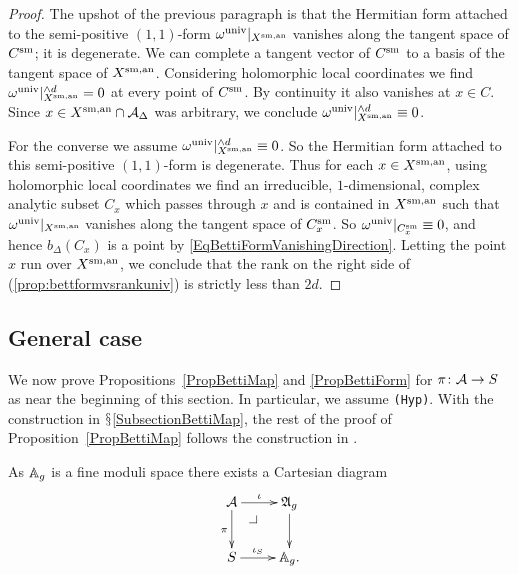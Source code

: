 \begin{proof}
The upshot of the previous paragraph is that the Hermitian form
attached to the semi-positive $(1,1)$-form ${\omega}^{\mathrm{univ}}|_{{X}^{\mathrm{sm,an}}}$
 vanishes along the tangent space of ${C}^{\mathrm{sm}}$; it is degenerate.
We can complete a tangent vector of ${C}^{\mathrm{sm}}$  to a basis of
the tangent space of ${X}^{\mathrm{sm,an}}$. Considering holomorphic local
coordinates
we find ${\omega}^{\mathrm{univ}}|_{{X}^{\mathrm{sm,an}}}^{\wedge d}=0$ at every
point of ${C}^{\mathrm{sm}}$. By continuity it also vanishes at $x \in C$. Since
$x\in {X}^{\mathrm{sm,an}}\cap\mathcal{A}_\Delta$ was arbitrary, we conclude
${\omega}^{\mathrm{univ}}|_{{X}^{\mathrm{sm,an}}}^{\wedge d}\equiv 0$. 

For the converse we assume
${\omega}^{\mathrm{univ}}|_{{X}^{\mathrm{sm,an}}}^{\wedge d}\equiv 0$. So the
Hermitian form attached to this semi-positive $(1,1)$-form is
degenerate. Thus for each $x \in {X}^{\mathrm{sm,an}}$, using holomorphic local coordinates we find an irreducible,  $1$-dimensional,  complex analytic subset $C_x$ which passes through $x$ and is contained in ${X}^{\mathrm{sm,an}}$ such that $\omega^{\mathrm{univ}}|_{{X}^{\mathrm{sm,an}}}$ vanishes along the tangent space of ${C}^{\mathrm{sm}}_x$. So ${\omega}^{\mathrm{univ}}|_{{C}^{\mathrm{sm}}_x}\equiv 0$, and hence 
 $b_\Delta(C_x)$ is a point
by \eqref{EqBettiFormVanishingDirection}.
Letting the point $x$ run over ${X}^{\mathrm{sm,an}}$, we conclude that the rank on the right
side of (\ref{prop:bettformvsrankuniv}) is strictly less than $2d$. 
\end{proof}


\subsection{General case}
We now prove Propositions~\ref{PropBettiMap}
and \ref{PropBettiForm} for
 $\pi \colon \mathcal{A} \rightarrow S$ as near the beginning of this section.
 In particular, we assume \texttt{(Hyp)}. With the construction in $\mathsection$\ref{SubsectionBettiMap}, the rest of the proof of Proposition~\ref{PropBettiMap} follows the construction in \cite[$\mathsection$4]{GaoBettiRank}. 


As
${\mathbb{A}}_g$ is a fine moduli space there exists a Cartesian diagram
\begin{equation*}%
\xymatrix{
\cA \ar[r]^-{\iota} \ar[d]_{\pi} \pullbackcorner & \mathfrak{A}_g \ar[d] \\
S \ar[r]^-{\iota_S} & \mathbb{A}_g.
}
\end{equation*}

